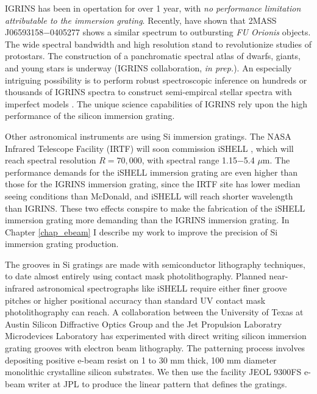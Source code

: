IGRINS has been in opertation for over 1 year, with \emph{no performance limitation attributable to the immersion grating}.  Recently, \citet{2015ATel.6901....1P} have shown that 2MASS J06593158$-$0405277 shows a similar spectrum to outbursting \emph{FU Orionis} objects.  The wide spectral bandwidth and high resolution stand to revolutionize studies of protostars.  The construction of a panchromatic spectral atlas of dwarfs, giants, and young stars is underway (IGRINS collaboration, \emph{in prep.}).  An especially intriguing possibility is to perform robust spectroscopic inference on hundreds or thousands of IGRINS spectra to construct semi-empircal stellar spectra with imperfect models \citep{2014arXiv1412.5177C}.  The unique science capabilities of IGRINS rely upon the high performance of the silicon immersion grating.

Other astronomical instruments are using Si immersion gratings.  The NASA Infrared Telescope Facility (IRTF) will soon commission iSHELL \citep{2012SPIE.8446E..2CR}, which will reach spectral resolution $R=70,000$, with spectral range 1.15$-$5.4 $\mu$m.  The performance demands for the iSHELL immersion grating are even higher than those for the IGRINS immersion grating, since the IRTF site has lower median seeing conditions than McDonald, and iSHELL will reach shorter wavelength than IGRINS.  These two effects conspire to make the fabrication of the iSHELL immersion grating more demanding than the IGRINS immersion grating.  In Chapter \ref{chap_ebeam} I describe my work to improve the precision of Si immersion grating production.

The grooves in Si gratings are made with semiconductor lithography techniques, to date almost entirely using contact mask photolithography.  Planned near-infrared astronomical spectrographs like iSHELL require either finer groove pitches or higher positional accuracy than standard UV contact mask photolithography can reach.  A collaboration between the University of Texas at Austin Silicon Diffractive Optics Group and the Jet Propulsion Laboratry Microdevices Laboratory has experimented with direct writing silicon immersion grating grooves with electron beam lithography.  The patterning process involves depositing positive e-beam resist on 1 to 30 mm thick, 100 mm diameter monolithic crystalline silicon substrates.  We then use the facility JEOL 9300FS e-beam writer at JPL to produce the linear pattern that defines the gratings.

